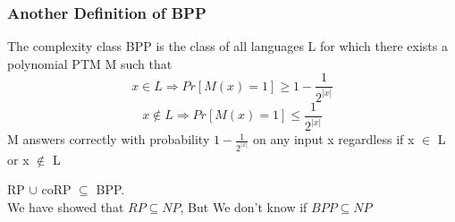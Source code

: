 \documentclass{beamer}
\begin{document}
\begin{frame}
\frametitle{Another Definition of BPP}
\begin{definition}[BPP]
	The complexity class BPP is the class of all languages L for which there exists a polynomial PTM M such that
	$$
	x \in L \Rightarrow Pr[M(x) = 1] \geq 1-\frac{1}{2^{|x|}}
	$$
	$$
	x \notin L \Rightarrow Pr[M(x) = 1] \leq \frac{1}{2^{|x|}}
	$$
	M answers correctly with probability $1-\frac{1}{2^{|x|}}$ on any input x regardless if x $\in$ L or x $\notin$ L
\end{definition}
RP $\cup$ coRP $\subseteq$ BPP.\\
We have showed that $RP \subseteq NP$, But We don't know if $BPP \subseteq NP$
\end{frame}

\end{document}

